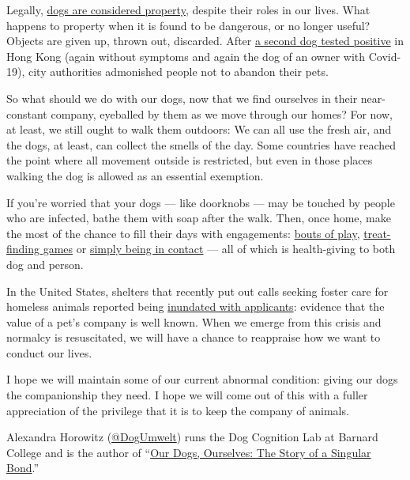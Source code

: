 Legally,
\href{https://www.theglobeandmail.com/opinion/article-when-it-comes-to-dogs-we-shouldnt-call-ourselves-owners/}{dogs
are considered property}, despite their roles in our lives. What happens
to property when it is found to be dangerous, or no longer useful?
Objects are given up, thrown out, discarded. After
\href{https://www.marketwatch.com/story/second-dog-tests-positive-for-coronavirus-as-owners-warned-not-to-abandon-pets-2020-03-20}{a
second dog tested positive} in Hong Kong (again without symptoms and
again the dog of an owner with Covid-19), city authorities admonished
people not to abandon their pets.

So what should we do with our dogs, now that we find ourselves in their
near-constant company, eyeballed by them as we move through our homes?
For now, at least, we still ought to walk them outdoors: We can all use
the fresh air, and the dogs, at least, can collect the smells of the
day. Some countries have reached the point where all movement outside is
restricted, but even in those places walking the dog is allowed as an
essential exemption.

If you're worried that your dogs --- like doorknobs --- may be touched
by people who are infected, bathe them with soap after the walk. Then,
once home, make the most of the chance to fill their days with
engagements: \href{https://doi.org/10.1007/s10071-016-0976-3}{bouts of
play},
\href{https://doi.org/10.1016/j.applanim.2018.12.009}{treat-finding
games} or \href{https://doi.org/10.3389/fpsyg.2017.01796}{simply being
in contact} --- all of which is health-giving to both dog and person.

In the United States, shelters that recently put out calls seeking
foster care for homeless animals reported being
\href{https://www.nytimes.com/2020/03/19/us/coronavirus-foster-pets.html}{inundated
with applicants}: evidence that the value of a pet's company is well
known. When we emerge from this crisis and normalcy is resuscitated, we
will have a chance to reappraise how we want to conduct our lives.

I hope we will maintain some of our current abnormal condition: giving
our dogs the companionship they need. I hope we will come out of this
with a fuller appreciation of the privilege that it is to keep the
company of animals.

Alexandra Horowitz
(\href{https://twitter.com/DogUmwelt?ref_src=twsrc\%5Egoogle\%7Ctwcamp\%5Eserp\%7Ctwgr\%5Eauthor}{@DogUmwelt})
runs the Dog Cognition Lab at Barnard College and is the author of
``\href{https://www.simonandschuster.com/books/Our-Dogs-Ourselves/Alexandra-Horowitz/9781501175008}{Our
Dogs, Ourselves: The Story of a Singular Bond}.''


